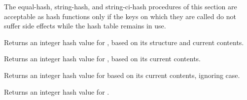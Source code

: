 The {\cf equal-hash}, {\cf string-hash}, and {\cf string-ci-hash}
procedures of this section are acceptable as hash functions only
if the keys on which they are called do not suffer side effects
while the hash table remains in use.

\begin{entry}{}

Returns an integer hash value for , based on
its structure and current contents.
\end{entry}

\begin{entry}{}

Returns an integer hash value for , based on
its current contents.
\end{entry}

\begin{entry}{}

Returns an integer hash value for  based on
its current contents, ignoring case.
\end{entry}

\begin{entry}{}

Returns an integer hash value for .
\end{entry}

